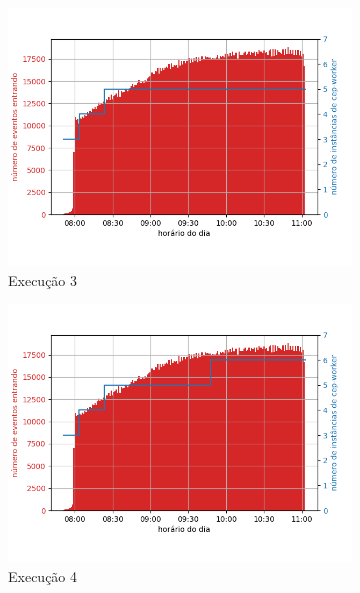 \begin{figure}[h!]
\begin{subfigure}{.5\textwidth}
  \centering
  \includegraphics[width=\linewidth]{figuras/graphics/carga_e_workers_horario8-dez-is.png}  
  \caption{Execução 3}
  \label{fig:cewh-8-dez-is}
\end{subfigure}
\begin{subfigure}{.5\textwidth}
  \centering
  \includegraphics[width=\linewidth]{figuras/graphics/carga_e_workers_horario9-dez-is.png}  
  \caption{Execução 4}
  \label{fig:cewh-9-dez-is}
\end{subfigure}
\begin{subfigure}{.5\textwidth}
  \centering

\end{subfigure}
\end{figure}
